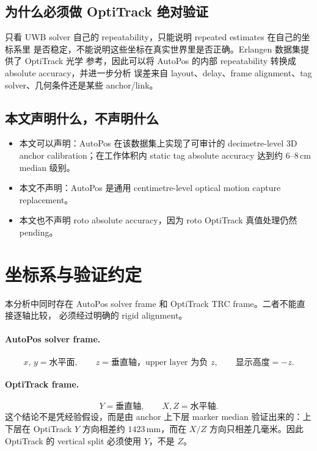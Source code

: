 \documentclass[11pt,a4paper]{article}
\newcommand{\mm}{\,\si{\milli\meter}}
\begin{document}
\subsection{为什么必须做 OptiTrack 绝对验证}
只看 UWB solver 自己的 repeatability，只能说明 repeated estimates 在自己的坐标系里
是否稳定，不能说明这些坐标在真实世界里是否正确。Erlangen 数据集提供了 OptiTrack 光学
参考，因此可以将 AutoPos 的内部 repeatability 转换成 absolute accuracy，并进一步分析
误差来自 layout、delay、frame alignment、tag solver、几何条件还是某些 anchor/link。

\subsection{本文声明什么，不声明什么}
\begin{itemize}[leftmargin=1.4em]
  \item 本文可以声明：AutoPos 在该数据集上实现了可审计的 decimetre-level 3D anchor
        calibration；在工作体积内 static tag absolute accuracy 达到约 $6$--$8\,\si{\centi\meter}$
        median 级别。
  \item 本文不声明：AutoPos 是通用 centimetre-level optical motion capture replacement。
  \item 本文也不声明 roto absolute accuracy，因为 roto OptiTrack 真值处理仍然 pending。
\end{itemize}

\section{坐标系与验证约定}
\label{sec:conventions}

本分析中同时存在 AutoPos solver frame 和 OptiTrack TRC frame。二者不能直接逐轴比较，
必须经过明确的 rigid alignment。

\paragraph{AutoPos solver frame.}
\[
  x,\,y=\text{水平面},\qquad
  z=\text{垂直轴，upper layer 为负 }z,\qquad
  \text{显示高度}=-z.
\]

\paragraph{OptiTrack frame.}
\[
  Y=\text{垂直轴},\qquad X,Z=\text{水平轴}.
\]
这个结论不是凭经验假设，而是由 anchor 上下层 marker median 验证出来的：上下层在
OptiTrack $Y$ 方向相差约 $1423\mm$，而在 $X/Z$ 方向只相差几毫米。因此 OptiTrack 的
vertical split 必须使用 $Y$，不是 $Z$。
\end{document}
